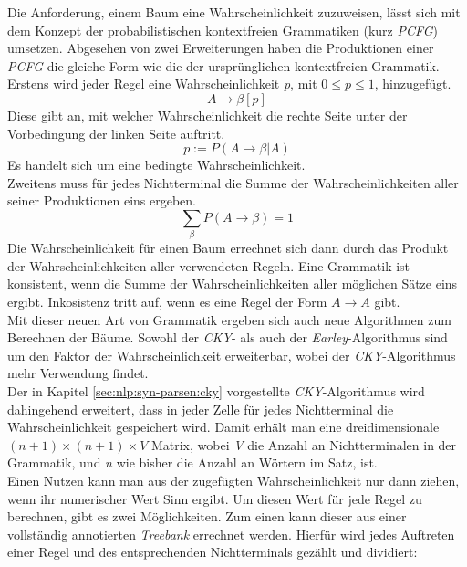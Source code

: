 Die Anforderung, einem Baum eine Wahrscheinlichkeit zuzuweisen, lässt sich mit dem Konzept der probabilistischen kontextfreien Grammatiken (kurz \textit{PCFG}) umsetzen. Abgesehen von zwei Erweiterungen haben die Produktionen einer \textit{PCFG} die gleiche Form wie die der ursprünglichen kontextfreien Grammatik. Erstens wird jeder Regel eine Wahrscheinlichkeit \textit{p}, mit \( 0 \leq p \leq 1 \), hinzugefügt.
\begin{equation}
A \to \beta  [p]
\end{equation}
Diese gibt an, mit welcher Wahrscheinlichkeit die rechte Seite unter der Vorbedingung der linken Seite auftritt.
\begin{equation}
p := P(A \to \beta | A)
\end{equation}
Es handelt sich um eine bedingte Wahrscheinlichkeit.\\ 
Zweitens muss für jedes Nichtterminal die Summe der Wahrscheinlichkeiten aller seiner Produktionen eins ergeben.
\begin{equation}
\sum_{\beta} P(A \to \beta) = 1
\end{equation}
Die Wahrscheinlichkeit für einen Baum errechnet sich dann durch das Produkt der Wahrscheinlichkeiten aller verwendeten Regeln. Eine Grammatik ist konsistent, wenn die Summe der Wahrscheinlichkeiten aller möglichen Sätze eins ergibt. Inkosistenz tritt auf, wenn es eine Regel der Form \( A \to A \) gibt.\\
Mit dieser neuen Art von Grammatik ergeben sich auch neue Algorithmen zum Berechnen der Bäume. Sowohl der \textit{CKY}- als auch der \textit{Earley}-Algorithmus sind um den Faktor der Wahrscheinlichkeit erweiterbar, wobei der \textit{CKY}-Algorithmus mehr Verwendung findet. \\
Der in Kapitel \ref{sec:nlp:syn-parsen:cky} vorgestellte \textit{CKY}-Algorithmus wird dahingehend erweitert, dass in jeder Zelle für jedes Nichtterminal die Wahrscheinlichkeit gespeichert wird. Damit erhält man eine dreidimensionale \( (n+1) \times (n+1) \times V\) Matrix, wobei \textit{V} die Anzahl an Nichtterminalen in der Grammatik, und \textit{n} wie bisher die Anzahl an Wörtern im Satz, ist. \\
Einen Nutzen kann man aus der zugefügten Wahrscheinlichkeit nur dann ziehen, wenn ihr numerischer Wert Sinn ergibt. Um diesen Wert für jede Regel zu berechnen, gibt es zwei Möglichkeiten. Zum einen kann dieser aus einer vollständig annotierten \textit{Treebank} errechnet werden. Hierfür wird jedes Auftreten einer Regel und des entsprechenden Nichtterminals gezählt und dividiert: 

